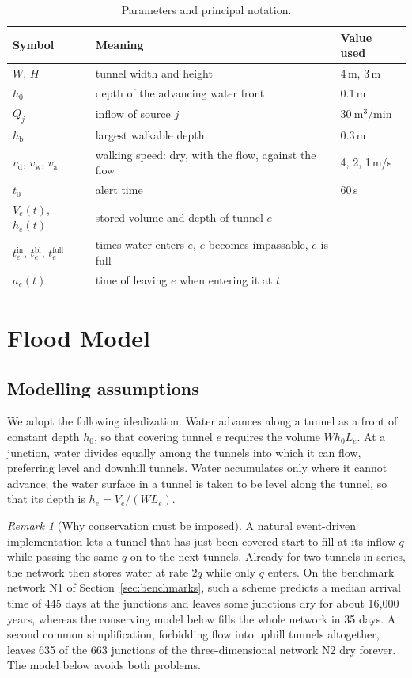 \documentclass[11pt,a4paper]{article}
\theoremstyle{plain}
\theoremstyle{definition}
\theoremstyle{remark}
\newtheorem*{remark}{Remark}
\newcommand{\tin}{t^{\mathrm{in}}}
\newcommand{\tbl}{t^{\mathrm{bl}}}
\newcommand{\tfull}{t^{\mathrm{full}}}
\newcommand{\hb}{h_{\mathrm{b}}}
\newcommand{\vd}{v_{\mathrm{d}}}
\newcommand{\vw}{v_{\mathrm{w}}}
\newcommand{\va}{v_{\mathrm{a}}}
\begin{document}
\begin{table}[htbp]
  \centering\small
  \begin{tabular}{@{}l l l@{}}
    \toprule
    Symbol & Meaning & Value used \\
    \midrule
    $W$, $H$ & tunnel width and height & 4\,m, 3\,m \\
    $h_0$ & depth of the advancing water front & 0.1\,m \\
    $Q_j$ & inflow of source $j$ & $30\ \mathrm{m^3/min}$ \\
    $\hb$ & largest walkable depth & 0.3\,m \\
    $\vd$, $\vw$, $\va$ & walking speed: dry, with the flow, against the flow & 4, 2, 1\,m/s \\
    $t_0$ & alert time & 60\,s \\
    \midrule
    $V_e(t)$, $h_e(t)$ & stored volume and depth of tunnel $e$ & \\
    $\tin_e$, $\tbl_e$, $\tfull_e$ & times water enters $e$, $e$ becomes impassable, $e$ is full & \\
    $a_e(t)$ & time of leaving $e$ when entering it at $t$ & \\
    \bottomrule
  \end{tabular}
  \caption{Parameters and principal notation.}
  \label{tab:params}
\end{table}

\section{Flood Model}\label{sec:flood}

\subsection{Modelling assumptions}
We adopt the following idealization. Water advances along a tunnel as a front of constant depth $h_0$, so that covering tunnel $e$ requires the volume $W h_0 L_e$. At a junction, water divides equally among the tunnels into which it can flow, preferring level and downhill tunnels. Water accumulates only where it cannot advance; the water surface in a tunnel is taken to be level along the tunnel, so that its depth is $h_e = V_e/(W L_e)$.

\begin{remark}[Why conservation must be imposed]\label{rem:naive}
A natural event-driven implementation lets a tunnel that has just been covered start to fill at its inflow $q$ while passing the same $q$ on to the next tunnels. Already for two tunnels in series, the network then stores water at rate $2q$ while only $q$ enters. On the benchmark network N1 of Section~\ref{sec:benchmarks}, such a scheme predicts a median arrival time of 445 days at the junctions and leaves some junctions dry for about 16{,}000 years, whereas the conserving model below fills the whole network in 35 days. A second common simplification, forbidding flow into uphill tunnels altogether, leaves 635 of the 663 junctions of the three-dimensional network N2 dry forever. The model below avoids both problems.
\end{remark}
\end{document}
